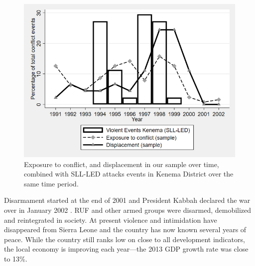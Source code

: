 \begin{figure}[htb]
  \includegraphics[width=0.8\linewidth]{"chapters/slfootball/figures/f1_violent_events.png"}
  \caption{Exposure to conflict, and displacement in our sample over time, combined with SLL-LED attacks events in Kenema District over the same time period.} \label{fig:slf:conflictexposure}
\end{figure}

Disarmament started at the end of 2001 and President Kabbah declared the war over in January 2002 \cite{Peters2011}. RUF and other armed groups were disarmed, demobilized and reintegrated in society. At present violence and intimidation have disappeared from Sierra Leone and the country has now known several years of peace. While the country still ranks low on close to all development indicators, the local economy is improving each year––the 2013 GDP growth rate was close to 13\%.

